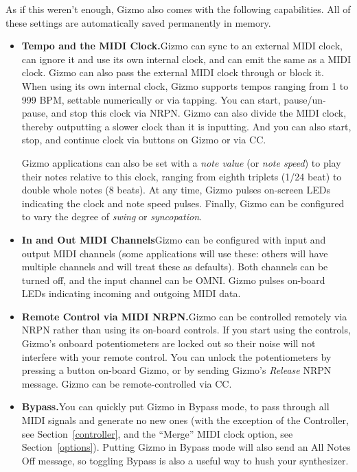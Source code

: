 \documentclass{article}
\begin{document}
As if this weren't enough, Gizmo also comes with the following capabilities.  All of these settings are automatically saved permanently in memory.

\begin{itemize}
\item {\bf Tempo and the MIDI Clock.}\quad Gizmo can sync to an external MIDI clock, can ignore it and use its own internal clock, and can emit the same as a MIDI clock.  Gizmo can also pass the external MIDI clock through or block it.  When using its own internal clock, Gizmo supports tempos ranging from 1 to 999 BPM, settable numerically or via tapping.  You can start, pause/un-pause, and stop this clock via NRPN. Gizmo can also divide the MIDI clock, thereby outputting a slower clock than it is inputting.  And you can also start, stop, and continue clock via buttons on Gizmo or via CC.

Gizmo applications can also be set with a {\it note value} (or {\it note speed}) to play their notes relative to this clock, ranging from eighth triplets (1/24 beat) to double whole notes (8 beats).  At any time, Gizmo pulses on-screen LEDs indicating the clock and note speed pulses.  Finally, Gizmo can be configured to vary the degree of {\it swing} or {\it syncopation}.

\item {\bf In and Out MIDI Channels}\quad Gizmo can be configured with input and output MIDI channels (some applications will use these: others will have multiple channels and will treat these as defaults).  Both channels can be turned off, and the input channel can be OMNI.  Gizmo pulses on-board LEDs indicating incoming and outgoing MIDI data.  

\item {\bf Remote Control via MIDI NRPN.}\quad Gizmo can be controlled remotely via NRPN rather than using its on-board controls.  If you start using the controls, Gizmo's onboard potentiometers are locked out so their noise will not interfere with your remote control.  You can unlock the potentiometers by pressing a button on-board Gizmo, or by sending Gizmo's {\it Release} NRPN message. Gizmo can be remote-controlled via CC.

\item {\bf Bypass.}\quad You can quickly put Gizmo in Bypass mode, to pass through all MIDI signals and generate no new ones (with the exception of the Controller, see Section~\ref{controller}, and the ``Merge'' MIDI clock option, see Section~\ref{options}).  Putting Gizmo in Bypass mode will also send an All Notes Off message, so toggling Bypass is also a useful way to hush your synthesizer.


\end{itemize}
\end{document}
